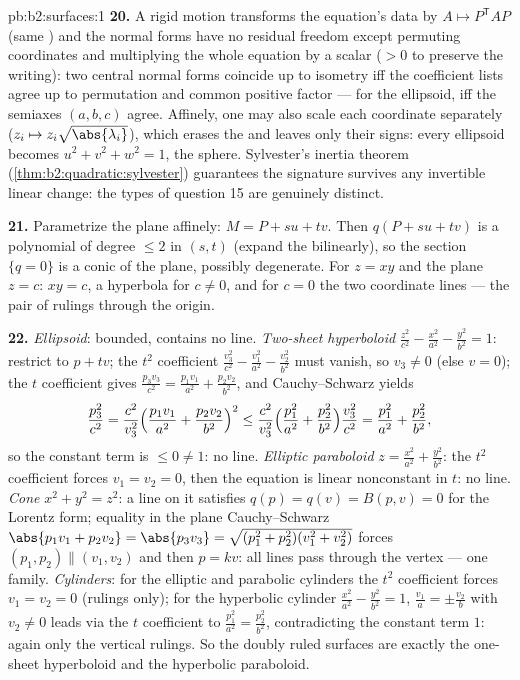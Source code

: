 \begin{solution}{pb:b2:surfaces:1}
\textbf{20.} A rigid motion transforms the equation's data by
$A \mapsto P^{\mathsf T}\!AP$ (same ) and the
normal forms have no residual freedom except permuting
coordinates and multiplying the whole equation by a scalar
($> 0$ to preserve the writing): two central normal forms
coincide up to isometry iff the coefficient lists agree up to
permutation and common positive factor --- for the ellipsoid,
iff the semiaxes $(a, b, c)$ agree. Affinely, one may also
scale each coordinate separately ($z_i \mapsto z_i\sqrt{\abs
{\lambda_i}}$), which erases the  and leaves only
their signs: every ellipsoid becomes $u^2 + v^2 + w^2 = 1$,
the sphere. Sylvester's inertia theorem
(\cref{thm:b2:quadratic:sylvester}) guarantees the signature
survives any invertible linear change: the  types of
question 15 are genuinely distinct.

\textbf{21.} Parametrize the plane affinely: $M = P + su +
tv$. Then $q(P + su + tv)$ is a polynomial of degree $\leq 2$
in $(s, t)$ (expand the  bilinearly), so the
section $\{q = 0\}$ is a conic of the plane, possibly
degenerate. For $z = xy$ and the plane $z = c$: $xy = c$, a
hyperbola for $c \neq 0$, and for $c = 0$ the two coordinate
lines --- the pair of rulings through the origin.

\textbf{22.} \emph{Ellipsoid}: bounded, contains no line.
\emph{Two-sheet hyperboloid} $\frac{z^2}{c^2} -
\frac{x^2}{a^2} - \frac{y^2}{b^2} = 1$: restrict to $p + tv$;
the $t^2$ coefficient $\frac{v_3^2}{c^2} - \frac{v_1^2}{a^2}
- \frac{v_2^2}{b^2}$ must vanish, so $v_3 \neq 0$ (else $v =
0$); the $t$ coefficient gives $\frac{p_3v_3}{c^2} =
\frac{p_1v_1}{a^2} + \frac{p_2v_2}{b^2}$, and Cauchy--Schwarz
yields
\[
\frac{p_3^2}{c^2}
= \frac{c^2}{v_3^2}\Bigl(\frac{p_1v_1}{a^2} +
\frac{p_2v_2}{b^2}\Bigr)^2
\leq \frac{c^2}{v_3^2}\Bigl(\frac{p_1^2}{a^2} +
\frac{p_2^2}{b^2}\Bigr)\frac{v_3^2}{c^2}
= \frac{p_1^2}{a^2} + \frac{p_2^2}{b^2},
\]
so the constant term is $\leq 0 \neq 1$: no line.
\emph{Elliptic paraboloid} $z = \frac{x^2}{a^2} +
\frac{y^2}{b^2}$: the $t^2$ coefficient forces $v_1 = v_2 =
0$, then the equation is linear nonconstant in $t$: no line.
\emph{Cone} $x^2 + y^2 = z^2$: a line on it satisfies $q(p) =
q(v) = B(p, v) = 0$ for the Lorentz form; equality in the
plane Cauchy--Schwarz $\abs{p_1v_1 + p_2v_2} = \abs{p_3v_3} =
\sqrt{(p_1^2 + p_2^2)(v_1^2 + v_2^2)}$ forces $(p_1, p_2)
\parallel (v_1, v_2)$ and then $p = kv$: all lines pass
through the vertex --- one family. \emph{Cylinders}: for the
elliptic and parabolic cylinders the $t^2$ coefficient forces
$v_1 = v_2 = 0$ (rulings only); for the hyperbolic cylinder
$\frac{x^2}{a^2} - \frac{y^2}{b^2} = 1$, $\frac{v_1}a = \pm
\frac{v_2}b$ with $v_2 \neq 0$ leads via the $t$ coefficient
to $\frac{p_1^2}{a^2} = \frac{p_2^2}{b^2}$, contradicting the
constant term $1$: again only the vertical rulings. So the
doubly ruled  surfaces are exactly the one-sheet
hyperboloid and the hyperbolic paraboloid.


\end{solution}
